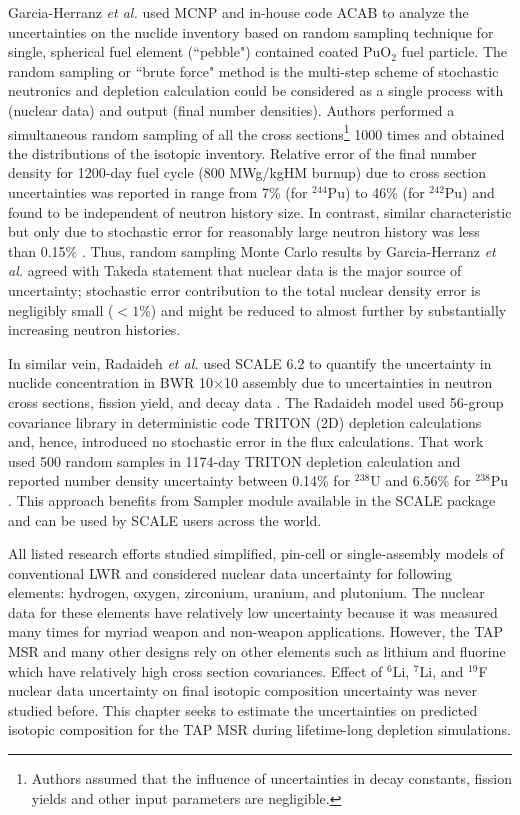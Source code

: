 Garcia-Herranz \emph{et al.} used MCNP and in-house code ACAB to analyze the 
uncertainties on the nuclide inventory based on random samplinq technique for 
single, spherical fuel element (``pebble") contained coated PuO$_2$ fuel 
particle. The random sampling or ``brute force" method is the multi-step 
scheme of stochastic neutronics and depletion calculation could be considered 
as a single process with (nuclear data) and output (final number densities). 
Authors performed a simultaneous random sampling of all the cross 
sections\footnote{Authors assumed that the influence of uncertainties in decay 
constants, fission yields and other input parameters are negligible.} 1000 
times and obtained the distributions of the isotopic inventory. Relative error 
of the final number density for 1200-day fuel cycle (800 MWg/kgHM burnup) due 
to cross section uncertainties was reported in range from 7\% (for $^{244}$Pu) 
to 46\% (for $^{242}$Pu) and found to be independent of neutron history size. 
In contrast, similar characteristic but only due to stochastic error for 
reasonably large neutron history was less than 0.15\% 
\cite{garcia-herranz_propagation_2008}. Thus, random sampling Monte Carlo 
results by Garcia-Herranz \emph{et al.} agreed with Takeda statement that 
nuclear data is the major source of uncertainty; stochastic error contribution 
to the total nuclear density error is negligibly small ($<1$\%) and might be 
reduced to almost further by substantially increasing neutron histories.

In similar vein, Radaideh \emph{et al.} used SCALE 6.2 
\cite{rearden_scale_2018} to quantify the uncertainty in nuclide concentration 
in \gls{BWR} 10$\times$10 assembly due to uncertainties in neutron cross 
sections, fission yield, and decay data \cite{radaideh_uncertainty_2018}. The 
Radaideh model used 56-group covariance library in deterministic code TRITON 
(2D) depletion calculations and, hence, introduced no stochastic error in the 
flux calculations. That work used 500 random samples in 1174-day TRITON 
depletion calculation and reported number density uncertainty between 0.14\% 
for $^{238}$U and 6.56\% for $^{238}$Pu \cite{radaideh_novel_2019-1}. This 
approach
benefits from Sampler module available in the SCALE package and 
can be used by SCALE users across the world.

All listed research efforts studied simplified, pin-cell or single-assembly 
models of conventional \gls{LWR} and considered nuclear data uncertainty for 
following elements: hydrogen, oxygen, zirconium, uranium, and plutonium. The 
nuclear data for these elements have relatively low uncertainty because it was 
measured many times for myriad weapon and non-weapon applications. However, 
the \gls{TAP} \gls{MSR} and many other designs rely on other elements such as 
lithium and fluorine which have relatively high cross section covariances. 
Effect of $^6$Li, $^7$Li, and $^{19}$F nuclear data uncertainty on final 
isotopic composition uncertainty was never studied before. This chapter seeks 
to estimate the uncertainties on predicted isotopic composition for the 
\gls{TAP} \gls{MSR} during lifetime-long depletion simulations.

